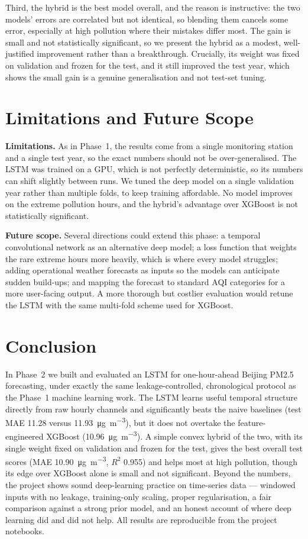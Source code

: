 \documentclass[onecolumn,11pt,journal]{IEEEtran}
\newcommand{\ugm}{\si{\micro\gram\per\cubic\metre}}
\begin{document}
Third, the hybrid is the best model overall, and the reason is instructive: the two models' errors are correlated but not identical, so blending them cancels some error, especially at high pollution where their mistakes differ most. The gain is small and not statistically significant, so we present the hybrid as a modest, well-justified improvement rather than a breakthrough. Crucially, its weight was fixed on validation and frozen for the test, and it still improved the test year, which shows the small gain is a genuine generalisation and not test-set tuning.

\section{Limitations and Future Scope}
\textbf{Limitations.} As in Phase~1, the results come from a single monitoring station and a single test year, so the exact numbers should not be over-generalised. The LSTM was trained on a GPU, which is not perfectly deterministic, so its numbers can shift slightly between runs. We tuned the deep model on a single validation year rather than multiple folds, to keep training affordable. No model improves on the extreme pollution hours, and the hybrid's advantage over XGBoost is not statistically significant.

\textbf{Future scope.} Several directions could extend this phase: a temporal convolutional network as an alternative deep model; a loss function that weights the rare extreme hours more heavily, which is where every model struggles; adding operational weather forecasts as inputs so the models can anticipate sudden build-ups; and mapping the forecast to standard AQI categories for a more user-facing output. A more thorough but costlier evaluation would retune the LSTM with the same multi-fold scheme used for XGBoost.

\section{Conclusion}
In Phase~2 we built and evaluated an LSTM for one-hour-ahead Beijing PM2.5 forecasting, under exactly the same leakage-controlled, chronological protocol as the Phase~1 machine learning work. The LSTM learns useful temporal structure directly from raw hourly channels and significantly beats the naive baselines (test MAE 11.28 versus 11.93~\ugm{}), but it does not overtake the feature-engineered XGBoost (10.96~\ugm{}). A simple convex hybrid of the two, with its single weight fixed on validation and frozen for the test, gives the best overall test scores (MAE 10.90~\ugm{}, $R^2$ 0.955) and helps most at high pollution, though its edge over XGBoost alone is small and not significant. Beyond the numbers, the project shows sound deep-learning practice on time-series data --- windowed inputs with no leakage, training-only scaling, proper regularisation, a fair comparison against a strong prior model, and an honest account of where deep learning did and did not help. All results are reproducible from the project notebooks.



\end{document}
